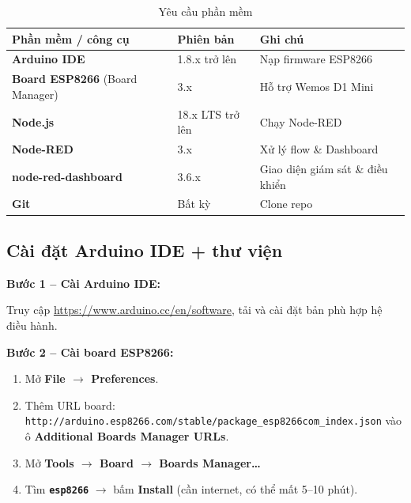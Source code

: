 \documentclass[13pt,a4paper]{article}
\newcommand{\code}[1]{\texttt{#1}}
\begin{document}
\begin{table}[htbp]
    \centering
    \caption{Yêu cầu phần mềm}
    \label{tbl:software}
    \begin{tabular}{|L{5cm}|C{3cm}|C{4.5cm}|}
        \hline
        \textbf{Phần mềm / công cụ} & \textbf{Phiên bản} & \textbf{Ghi chú} \\
        \hline
        \textbf{Arduino IDE} & 1.8.x trở lên & Nạp firmware ESP8266 \\
        \hline
        \textbf{Board ESP8266} (Board Manager) & 3.x & Hỗ trợ Wemos D1 Mini \\
        \hline
        \textbf{Node.js} & 18.x LTS trở lên & Chạy Node-RED \\
        \hline
        \textbf{Node-RED} & 3.x & Xử lý flow \& Dashboard \\
        \hline
        \textbf{node-red-dashboard} & 3.6.x & Giao diện giám sát \& điều khiển \\
        \hline
        \textbf{Git} & Bất kỳ & Clone repo \\
        \hline
    \end{tabular}
\end{table}

\subsection{Cài đặt Arduino IDE + thư viện}
\label{sec:arduino}

\textbf{Bước 1 -- Cài Arduino IDE:}

Truy cập \url{https://www.arduino.cc/en/software}, tải và cài đặt bản phù hợp hệ điều hành.

\textbf{Bước 2 -- Cài board ESP8266:}

\begin{enumerate}[label=\arabic*., leftmargin=1.5cm]
    \item Mở \textbf{File $\rightarrow$ Preferences}.
    \item Thêm URL board: \code{http://arduino.esp8266.com/stable/package\_esp8266com\_index.json} vào ô \textbf{Additional Boards Manager URLs}.
    \item Mở \textbf{Tools $\rightarrow$ Board $\rightarrow$ Boards Manager\ldots}
    \item Tìm \textbf{\code{esp8266}} $\rightarrow$ bấm \textbf{Install} (cần internet, có thể mất 5--10 phút).
\end{enumerate}
\end{document}
